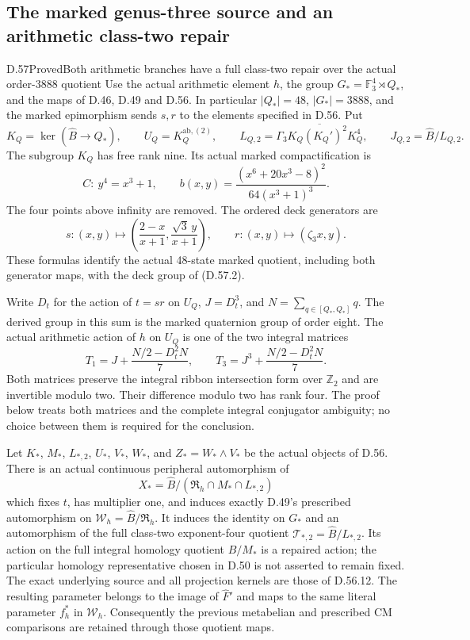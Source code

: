 \subsection*{The marked genus-three source and an arithmetic class-two repair}

\begin{statement}{D.57}{Proved}{Both arithmetic branches have a full class-two repair over the actual order-3888 quotient}
Use the actual arithmetic element \(h\), the group
\(G_*=\mathbb F_3^4\rtimes Q_*\), and the maps of D.46,
D.49 and D.56. In particular \(|Q_*|=48\), \(|G_*|=3888\),
and the marked epimorphism sends \(s,r\) to the elements
specified in D.56. Put
\[
 K_Q=\ker(\widehat B\longrightarrow Q_*),\qquad
 U_Q=K_Q^{\mathrm{ab},(2)},\qquad
 L_{Q,2}=\overline{\Gamma_3K_Q(K_Q')^2K_Q^4},
 \qquad J_{Q,2}=\widehat B/L_{Q,2}.
 \tag{D.57.1}
\]
The subgroup \(K_Q\) has free rank nine. Its actual marked
compactification is
\[
 C:\ y^4=x^3+1,\qquad
 b(x,y)=\frac{(x^6+20x^3-8)^2}{64(x^3+1)^3}.
 \tag{D.57.2}
\]
The four points above infinity are removed. The ordered deck
generators are
\[
 s:(x,y)\longmapsto
       \left(\frac{2-x}{x+1},\frac{\sqrt3\,y}{x+1}\right),
 \qquad r:(x,y)\longmapsto(\zeta_3x,y).
 \tag{D.57.3}
\]
These formulas identify the actual 48-state marked quotient,
including both generator maps, with the deck group of (D.57.2).

Write \(D_t\) for the action of \(t=sr\) on \(U_Q\),
\(J=D_t^3\), and
\(N=\sum_{q\in[Q_*,Q_*]}q\). The derived group in this sum
is the marked quaternion group of order eight. The actual
arithmetic action of \(h\) on \(U_Q\) is one of the two
integral matrices
\[
 T_1=J+\frac{N/2-D_t^2N}{7},\qquad
 T_3=J^3+\frac{N/2-D_t^2N}{7}.
 \tag{D.57.4}
\]
Both matrices preserve the integral ribbon intersection form
over \(\mathbb Z_2\) and are invertible modulo two. Their
difference modulo two has rank four. The proof below treats
both matrices and the complete integral conjugator ambiguity;
no choice between them is required for the conclusion.

Let \(K_*\), \(M_*\), \(L_{*,2}\), \(U_*\), \(V_*\),
\(W_*\), and \(Z_*=W_*\wedge V_*\) be the actual objects of
D.56. There is an actual continuous peripheral automorphism
of
\[
 X_* =\widehat B/
       (\mathfrak R_h\cap M_*\cap L_{*,2})
 \tag{D.57.5}
\]
which fixes \(t\), has multiplier one, and induces exactly
D.49's prescribed automorphism on
\(\mathcal W_h=\widehat B/\mathfrak R_h\).
It induces the identity on \(G_*\) and an automorphism of the
full class-two exponent-four quotient
\(\mathcal T_{*,2}=\widehat B/L_{*,2}\).
Its action on the full integral homology quotient
\(\widehat B/M_*\) is a repaired action; the particular
homology representative chosen in D.50 is not asserted to
remain fixed. The exact underlying source and all projection
kernels are those of D.56.12. The resulting parameter belongs
to the image of \(\widehat F'\) and maps to the same literal
parameter \(f_h^*\) in \(\mathcal W_h\). Consequently the
previous metabelian and prescribed CM comparisons are retained
through those quotient maps.


\end{statement}
